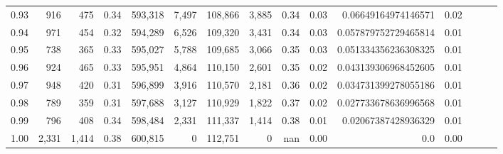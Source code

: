 \begin{tabular}{rrrrrrrrrrrrrrr}
0.93 &     916 &    475 &  0.34 &  593,318 &    7,497 &  108,866 &    3,885 &  0.34 &  0.03 &   0.06649164974146571 &      0.02 \\
0.94 &     971 &    454 &  0.32 &  594,289 &    6,526 &  109,320 &    3,431 &  0.34 &  0.03 &  0.057879752729465814 &      0.01 \\
0.95 &     738 &    365 &  0.33 &  595,027 &    5,788 &  109,685 &    3,066 &  0.35 &  0.03 &  0.051334356236308325 &      0.01 \\
0.96 &     924 &    465 &  0.33 &  595,951 &    4,864 &  110,150 &    2,601 &  0.35 &  0.02 &  0.043139306968452605 &      0.01 \\
0.97 &     948 &    420 &  0.31 &  596,899 &    3,916 &  110,570 &    2,181 &  0.36 &  0.02 &  0.034731399278055186 &      0.01 \\
0.98 &     789 &    359 &  0.31 &  597,688 &    3,127 &  110,929 &    1,822 &  0.37 &  0.02 &  0.027733678636996568 &      0.01 \\
0.99 &     796 &    408 &  0.34 &  598,484 &    2,331 &  111,337 &    1,414 &  0.38 &  0.01 &   0.02067387428936329 &      0.01 \\
1.00 &   2,331 &  1,414 &  0.38 &  600,815 &        0 &  112,751 &        0 &   nan &  0.00 &                   0.0 &      0.00 \\
\bottomrule
\end{tabular}

